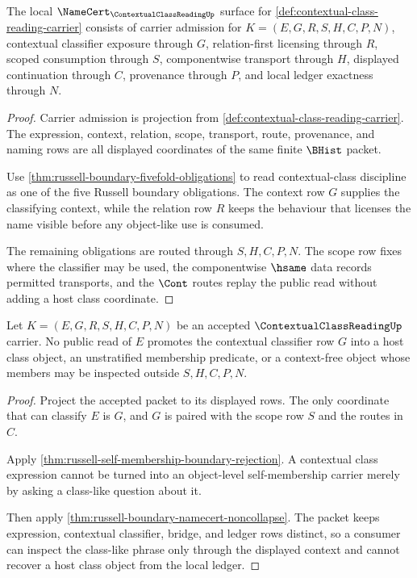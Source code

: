 \begin{theorem}
\label{thm:contextual-class-reading-namecert-obligations}
The local $\NameCert_{\ContextualClassReadingUp}$ surface for \autoref{def:contextual-class-reading-carrier} consists of carrier admission for $K=(E,G,R,S,H,C,P,N)$, contextual classifier exposure through $G$, relation-first licensing through $R$, scoped consumption through $S$, componentwise transport through $H$, displayed continuation through $C$, provenance through $P$, and local ledger exactness through $N$.
\end{theorem}
\begin{proof}
Carrier admission is projection from \autoref{def:contextual-class-reading-carrier}. The expression, context, relation, scope, transport, route, provenance, and naming rows are all displayed coordinates of the same finite $\BHist$ packet.

Use \autoref{thm:russell-boundary-fivefold-obligations} to read contextual-class discipline as one of the five Russell boundary obligations. The context row $G$ supplies the classifying context, while the relation row $R$ keeps the behaviour that licenses the name visible before any object-like use is consumed.

The remaining obligations are routed through $S,H,C,P,N$. The scope row fixes where the classifier may be used, the componentwise $\hsame$ data records permitted transports, and the $\Cont$ routes replay the public read without adding a host class coordinate.
\end{proof}

\begin{theorem}
\label{thm:contextual-class-reading-no-object-promotion}
Let $K=(E,G,R,S,H,C,P,N)$ be an accepted $\ContextualClassReadingUp$ carrier. No public read of $E$ promotes the contextual classifier row $G$ into a host class object, an unstratified membership predicate, or a context-free object whose members may be inspected outside $S,H,C,P,N$.
\end{theorem}
\begin{proof}
Project the accepted packet to its displayed rows. The only coordinate that can classify $E$ is $G$, and $G$ is paired with the scope row $S$ and the routes in $C$.

Apply \autoref{thm:russell-self-membership-boundary-rejection}. A contextual class expression cannot be turned into an object-level self-membership carrier merely by asking a class-like question about it.

Then apply \autoref{thm:russell-boundary-namecert-noncollapse}. The packet keeps expression, contextual classifier, bridge, and ledger rows distinct, so a consumer can inspect the class-like phrase only through the displayed context and cannot recover a host class object from the local ledger.
\end{proof}


